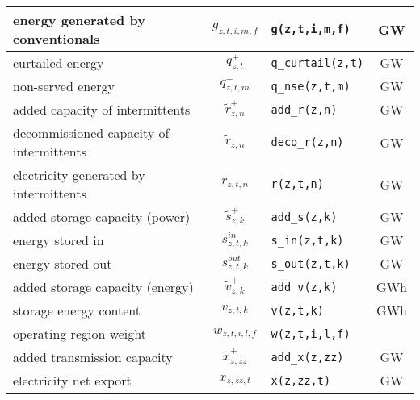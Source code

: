 \documentclass[11pt,a4paper]{article}
\begin{document}
\begin{longtable}{p{5.6cm} c l c}
energy generated by conventionals & $g_{z,t,i,m,f}$ & \texttt{g(z,t,i,m,f)} & GW \\ \hline
curtailed energy & $q^{+}_{z,t}$ & \texttt{q\_curtail(z,t)} & GW \\ \hline
non-served energy & $q^{-}_{z,t,m}$ & \texttt{q\_nse(z,t,m)} & GW \\ \hline
added capacity of intermittents & $\widetilde{r}^{+}_{z,n}$ & \texttt{add\_r(z,n)} & GW \\ \hline
decommissioned capacity of intermittents & $\widetilde{r}^{-}_{z,n}$ & \texttt{deco\_r(z,n)} & GW \\ \hline
electricity generated by intermittents & $r_{z,t,n}$ & \texttt{r(z,t,n)} & GW \\ \hline
added storage capacity (power) & $\widetilde{s}^{+}_{z,k}$ & \texttt{add\_s(z,k)} & GW \\ \hline
energy stored in & $s^{in}_{z,t,k}$ & \texttt{s\_in(z,t,k)} & GW \\ \hline
energy stored out & $s^{out}_{z,t,k}$ & \texttt{s\_out(z,t,k)} & GW \\ \hline
added storage capacity (energy) & $\widetilde{v}^{+}_{z,k}$ & \texttt{add\_v(z,k)} & GWh \\ \hline
storage energy content & $v_{z,t,k}$ & \texttt{v(z,t,k)} & GWh \\ \hline
operating region weight & $w_{z,t,i,l,f}$ & \texttt{w(z,t,i,l,f)} & \\ \hline
added transmission capacity & $\widetilde{x}^{+}_{z,zz}$ & \texttt{add\_x(z,zz)} & GW \\ \hline
electricity net export & $x_{z,zz,t}$ & \texttt{x(z,zz,t)} & GW \\ \hline \hline
\end{longtable}

\newpage
\end{document}
